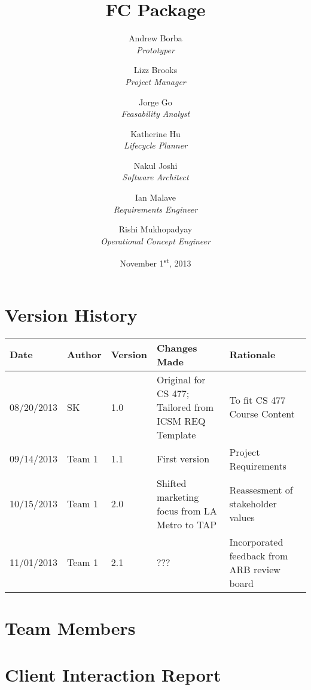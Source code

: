 \documentclass[titlepage]{article}
\title{FC Package}
\author{
	Andrew Borba\\ \emph{Prototyper}	\and
	 Lizz Brooks\\ \emph{Project Manager}	\and
	 Jorge Go\\ \emph{Feasability Analyst}	\and
	 Katherine Hu\\ \emph{Lifecycle Planner}	\and
	 Nakul Joshi\\ \emph{Software Architect}	\and
	 Ian Malave\\ \emph{Requirements Engineer}	\and
	 Rishi Mukhopadyay\\ \emph{Operational Concept Engineer}
}
\date{November 1\textsuperscript{st}, 2013}
\begin{document}
\pagestyle{fancy}
\chead{}
\lfoot{}
\cfoot{\thepage}
\rfoot{}

\maketitle
\tableofcontents
\newpage
\section{Version History}
\begin{table}[h]
	\centering
	\begin{tabularx}{\textwidth}{lllXX}
		\hline
		Date		& Author	& Version	& Changes Made											& Rationale                    \\ \hline
		08/20/2013	& SK		& 1.0		& Original for CS 477; Tailored from ICSM REQ Template	& To fit CS 477 Course Content \\ 
		09/14/2013	& Team 1	& 1.1 		& First version											& Project Requirements			\\
		10/15/2013	& Team 1	& 2.0 		& Shifted marketing focus from LA Metro to TAP			& Reassesment of stakeholder values\\
		11/01/2013	& Team 1	& 2.1		& ???													& Incorporated feedback from ARB review board
	\end{tabularx}
\end{table}
\newpage

\section{Team Members}

\newpage

\section{Client Interaction Report}

\newpage


\newpage


\newpage


		
\end{document}
